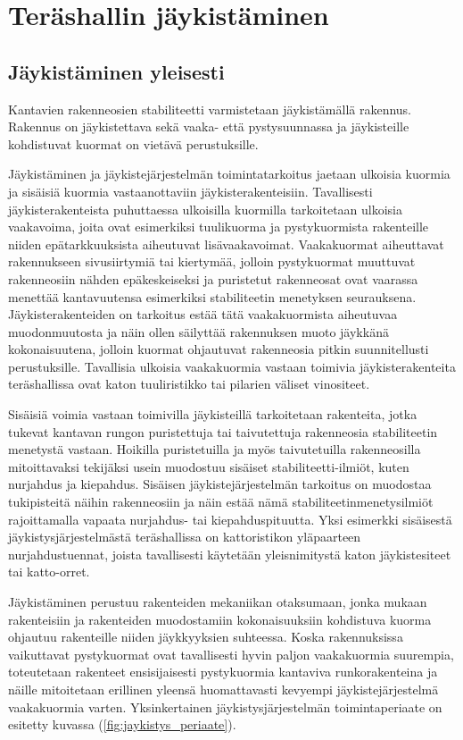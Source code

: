 \documentclass[12pt]{article}
\newenvironment{content}{\pagenumbering{arabic}}{}
\begin{document}
\begin{content}
\section{Teräshallin jäykistäminen}

\subsection{Jäykistäminen yleisesti}

Kantavien rakenneosien stabiliteetti varmistetaan jäykistämällä rakennus. Rakennus on jäykistettava sekä vaaka- että pystysuunnassa ja jäykisteille kohdistuvat kuormat on vietävä perustuksille. 

Jäykistäminen ja jäykistejärjestelmän toimintatarkoitus jaetaan ulkoisia kuormia ja sisäisiä kuormia vastaanottaviin jäykisterakenteisiin. Tavallisesti jäykisterakenteista puhuttaessa ulkoisilla kuormilla tarkoitetaan ulkoisia vaakavoima, joita ovat esimerkiksi tuulikuorma ja pystykuormista rakenteille niiden epätarkkuuksista aiheutuvat lisävaakavoimat. Vaakakuormat aiheuttavat rakennukseen sivusiirtymiä tai kiertymää, jolloin pystykuormat muuttuvat rakenneosiin nähden epäkeskeiseksi ja puristetut rakenneosat ovat vaarassa menettää kantavuutensa esimerkiksi stabiliteetin menetyksen seurauksena. Jäykisterakenteiden on tarkoitus estää tätä vaakakuormista aiheutuvaa muodonmuutosta ja näin ollen säilyttää rakennuksen muoto jäykkänä kokonaisuutena, jolloin kuormat ohjautuvat rakenneosia pitkin suunnitellusti perustuksille. Tavallisia ulkoisia vaakakuormia vastaan toimivia jäykisterakenteita teräshallissa ovat katon tuuliristikko tai pilarien väliset vinositeet. 

Sisäisiä voimia vastaan toimivilla jäykisteillä tarkoitetaan rakenteita, jotka tukevat kantavan rungon puristettuja tai taivutettuja rakenneosia stabiliteetin menetystä vastaan. Hoikilla puristetuilla ja myös taivutetuilla rakenneosilla mitoittavaksi tekijäksi usein muodostuu sisäiset stabiliteetti-ilmiöt, kuten nurjahdus ja kiepahdus. Sisäisen jäykistejärjestelmän tarkoitus on muodostaa tukipisteitä näihin rakenneosiin ja näin estää nämä stabiliteetinmenetysilmiöt rajoittamalla vapaata nurjahdus- tai kiepahduspituutta. Yksi esimerkki sisäisestä jäykistysjärjestelmästä teräshallissa on kattoristikon yläpaarteen nurjahdustuennat, joista tavallisesti käytetään yleisnimitystä katon jäykistesiteet tai katto-orret.

Jäykistäminen perustuu rakenteiden mekaniikan otaksumaan, jonka mukaan rakenteisiin ja rakenteiden muodostamiin kokonaisuuksiin kohdistuva kuorma ohjautuu rakenteille niiden jäykkyyksien suhteessa. Koska rakennuksissa vaikuttavat pystykuormat ovat tavallisesti hyvin paljon vaakakuormia suurempia, toteutetaan rakenteet ensisijaisesti pystykuormia kantaviva runkorakenteina ja näille mitoitetaan erillinen yleensä huomattavasti kevyempi jäykistejärjestelmä vaakakuormia varten. Yksinkertainen jäykistysjärjestelmän toimintaperiaate on esitetty kuvassa (\ref{fig:jaykistys_periaate}).


\end{content}
\end{document}
